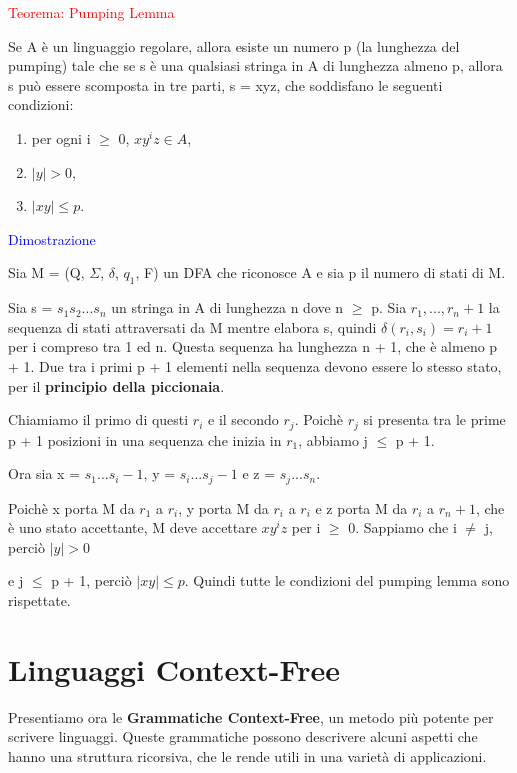 \documentclass{article}
\begin{document}
\begin{center}
    \textcolor{red}{Teorema: Pumping Lemma}
\end{center}

Se A è un linguaggio regolare, allora esiste un numero p (la lunghezza del pumping) tale che se s è una qualsiasi stringa in A di lunghezza almeno p, allora s può essere scomposta in tre parti, s = xyz, che soddisfano le seguenti condizioni:

\begin{enumerate}
    \item per ogni i $\geq$ 0, $xy^iz \in A$,
    \item $|y| > 0$,
    \item $|xy| \leq p$.
\end{enumerate}

\textcolor{blue}{Dimostrazione}

Sia M = (Q, $\Sigma$, $\delta$, $q_1$, F) un DFA che riconosce A e sia p il numero di stati di M. 

Sia s = $s_1s_2...s_n$ un stringa in A di lunghezza n dove n $\geq$ p. Sia $r_1, ..., r_n+1$ la sequenza di stati attraversati da M mentre elabora s, quindi $\delta(r_i,s_i) = r_i+1$ per i compreso tra 1 ed n. Questa sequenza ha lunghezza n + 1, che è almeno p + 1. Due tra i primi p + 1 elementi nella sequenza devono essere lo stesso stato, per il \textbf{principio della piccionaia}. 

Chiamiamo il primo di questi $r_i$ e il secondo $r_j$. Poichè $r_j$ si presenta tra le prime p + 1 posizioni in una sequenza che inizia in $r_1$, abbiamo j $\leq$ p + 1. 

Ora sia x = $s_1...s_i-1$, y = $s_i...s_j-1$ e z = $s_j...s_n$.

Poichè x porta M da $r_1$ a $r_i$, y porta M da $r_i$ a $r_i$ e z porta M da $r_i$ a $r_n+1$, che è uno stato accettante, M deve accettare $xy^iz$ per i $\geq$ 0. Sappiamo che i $\neq$ j, perciò $|y| > 0$

e j $\leq$ p + 1, perciò $|xy| \leq p$. Quindi tutte le condizioni del pumping lemma sono rispettate.

\section{Linguaggi Context-Free}

Presentiamo ora le \textbf{Grammatiche Context-Free}, un metodo più potente per scrivere linguaggi. Queste grammatiche possono descrivere alcuni aspetti che hanno una struttura ricorsiva, che le rende utili in una varietà di applicazioni.
\end{document}
